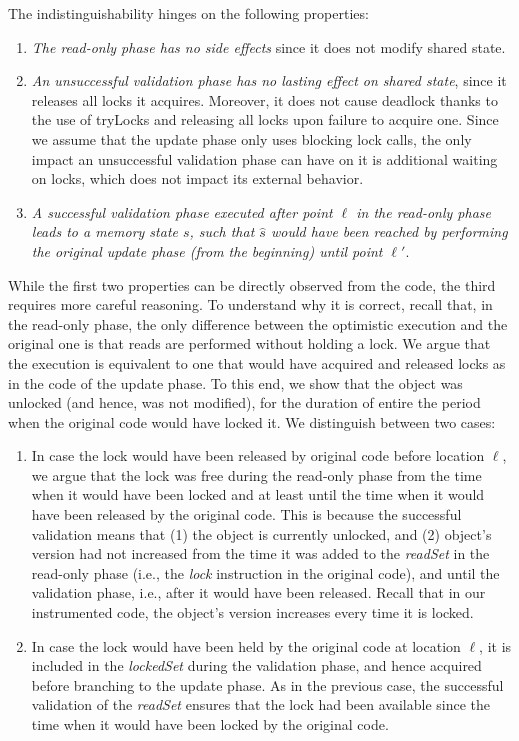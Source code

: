 \noindent
The indistinguishability hinges on the following properties:
\begin{enumerate}
\item \emph{The read-only phase has no side effects} since it does not modify shared state.
\item \emph{An unsuccessful validation phase has no lasting effect on shared state},
since it releases all locks it acquires. Moreover, it does not cause deadlock thanks to the use of tryLocks
and releasing all locks	upon failure to acquire one. Since we assume that the update phase only uses
blocking lock calls, the only impact an unsuccessful validation phase can have on it is additional waiting
on locks, which does not impact its external behavior.
\item \emph{A successful validation phase
executed after point $\ell$ in the read-only phase
leads to a memory state $s$, such that $\hat{s}$
would have been reached by performing the original
update phase (from the beginning) until point $\ell'$}.
\end{enumerate}

While the first two properties can be directly observed from the code, the third requires more careful reasoning.
To understand why it is correct, recall that, in the read-only phase,
the only difference between the optimistic execution and the original one is that reads are performed without
holding a lock. We argue that the execution is equivalent to one that would have acquired and released
locks as in the code of the update phase. To this end, we show that the object was unlocked
(and hence, was not modified), for the duration of entire the period when the original code would have locked it.
We distinguish between two cases:
\begin{enumerate}
\item In case the lock would have been released by original code before location $\ell$,
we argue that the lock was free during the read-only phase from the time when it would have been locked
and at least until the time when it would have been released by the original code.
This is because the successful validation means that (1) the object is currently
unlocked, and (2) object's version had not increased from the time it was added to the \emph{readSet} in the read-only phase
(i.e., the \emph{lock} instruction in the original code), and until the
validation phase, i.e., after it would have
been released. Recall that in our instrumented code, the object's version increases every time it is locked.
\item In case the lock would have been held by the original code at location $\ell$, it is included in
the \emph{lockedSet} during the validation phase, and hence acquired before branching to the update phase.
As in the previous case, the successful validation of the \emph{readSet} ensures that the lock had been
available since the time when it would have been locked by the original code.
\end{enumerate}

